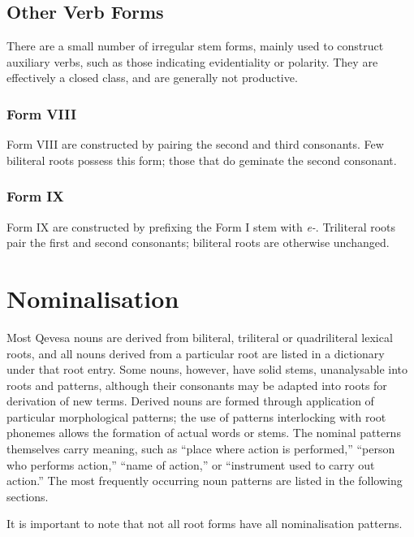 \documentclass[grammar]{subfiles}
\begin{document}
  \subsection{Other Verb Forms}
  \label{ssec:dev_other_verb_forms}

  There are a small number of irregular stem forms, mainly used to construct auxiliary verbs, such as those indicating evidentiality or polarity. They are effectively a closed class, and are generally not productive.

  \subsubsection{Form VIII}
  \label{sssec:dev_verb_form_viii}

  Form VIII are constructed by pairing the second and third consonants. Few biliteral roots possess this form; those that do geminate the second consonant.

  \subsubsection{Form IX}
  \label{sssec:dev_verb_form_ix}

  Form IX are constructed by prefixing the Form I stem with \textit{e-}. Triliteral roots pair the first and second consonants; biliteral roots are otherwise unchanged.

  \section{Nominalisation}
  \label{sec:dev_nominalisation}

  Most Qevesa nouns are derived from biliteral, triliteral or quadriliteral lexical roots, and all nouns derived from a particular root are listed in a dictionary under that root entry. Some nouns, however, have solid stems, unanalysable into roots and patterns, although their consonants may be adapted into roots for derivation of new terms. Derived nouns are formed through application of particular morphological patterns; the use of patterns interlocking with root phonemes allows the formation of actual words or stems. The nominal patterns themselves carry meaning, such as “place where action is performed,” “person who performs action,” “name of action,” or “instrument used to carry out action.” The most frequently occurring noun patterns are listed in the following sections.

  It is important to note that not all root forms have all nominalisation patterns.
\end{document}
